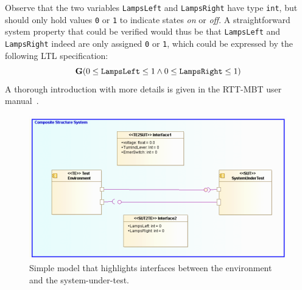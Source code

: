 %
%
%
Observe that the two variables {\tt LampsLeft} and {\tt LampsRight} have type {\tt int}, but should only hold values {\tt 0} or {\tt 1} to indicate states \emph{on} or \emph{off}.
%
A straightforward system property that could be verified would thus be that {\tt LampsLeft} and {\tt LampsRight} indeed are only assigned {\tt 0} or {\tt 1}, which could be expressed by the following LTL specification:
%
%
%
\[
\mathbf{G} (0 \leq {\tt LampsLeft} \leq 1 \wedge 0 \leq {\tt LampsRight} \leq 1)
\]
%
%
%
A thorough introduction with more details is given in the RTT-MBT user manual~\cite{rttmbtmanual}.
%
%
%
\begin{figure}
\centerline{\includegraphics[width=\textwidth]{figures/VSI-modelio_turn_indication_small_toplevel_composite.png}}
\caption{Simple model that highlights interfaces between the environment and
  the system-under-test.}
\label{figure:vsi-simple}
\end{figure}
%
